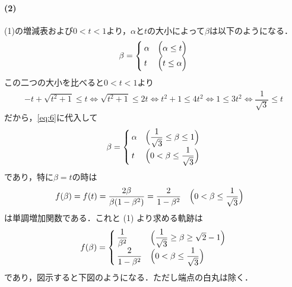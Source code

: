 \documentclass[../../main.tex]{subfiles}
\begin{document}
\paragraph{(2)}

(1)の増減表および$0<t<1$より，$\alpha$と$t$の大小によって$\beta$は以下のようになる．
\begin{align}
  \beta =
  \begin{cases}
    \alpha & \Bigl( \alpha \le t  \Bigr)  \\
    t      & \Bigl( t \le \alpha  \Bigr)
  \end{cases} \label{eq:6}
\end{align}
この二つの大小を比べると$0<t<1$より
\begin{align}
  -t + \sqrt{t^2+1} \le t \iff \sqrt{t^2+1} \le 2t \iff t^2+1 \le 4t^2 \iff 1 \le 3t^2 \iff \dfrac{1}{\sqrt{3}} \le t
\end{align}
だから，\cref{eq:6}に代入して
\begin{align}
  \beta =
  \begin{cases}
    \alpha  & \Bigl( \dfrac{1}{\sqrt{3}} \le \beta \le 1 \Bigr) \\
    t & \Bigl( 0 < \beta \le \dfrac{1}{\sqrt{3}} \Bigr)
  \end{cases} \label{eq:7}
\end{align}
であり，特に$\beta=t$の時は
\begin{align}
  f(\beta) &= f(t) = \dfrac{2\beta}{\beta (1-\beta^2)} = \dfrac{2}{1-\beta^2} \quad \Bigl( 0 < \beta \le \dfrac{1}{\sqrt{3}} \Bigr)
\end{align}
は単調増加関数である．これと (1) より求める軌跡は
\begin{align}
  f(\beta) =
  \begin{cases}
    \dfrac{1}{\beta^2} & \Bigl( \dfrac{1}{\sqrt{3}} \ge \beta \ge \sqrt{2}-1 \Bigr) \\
    \dfrac{2}{1-\beta^2} & \Bigl( 0 < \beta \le \dfrac{1}{\sqrt{3}} \Bigr)
  \end{cases}
\end{align}
であり，図示すると下図のようになる．ただし端点の白丸は除く．
\end{document}
